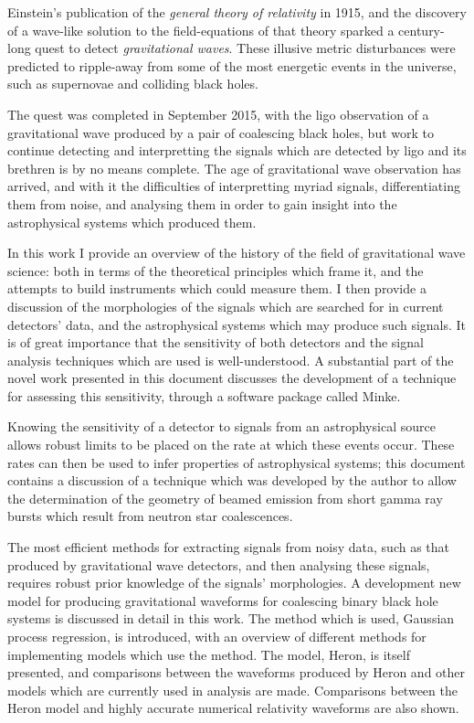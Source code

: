   Einstein's publication of the \textit{general theory of relativity} in 1915, and the discovery of a wave-like solution to the field-equations of that theory sparked a century-long quest to detect \textit{gravitational waves}.
  These illusive metric disturbances were predicted to ripple-away from some of the most energetic events in the universe, such as supernovae and colliding black holes.
  
  The quest was completed in September 2015, with the \gls{ligo} observation of a gravitational wave produced by a pair of coalescing black holes, but work to continue detecting and interpretting the signals which are detected by \gls{ligo} and its brethren is by no means complete.
  The age of gravitational wave observation has arrived, and with it the difficulties of interpretting myriad signals, differentiating them from noise, and analysing them in order to gain insight into the astrophysical systems which produced them.

  In this work I provide an overview of the history of the field of gravitational wave science: both in terms of the theoretical principles which frame it, and the attempts to build instruments which could measure them.
  I then provide a discussion of the morphologies of the signals which are searched for in current detectors' data, and the astrophysical systems which may produce such signals.
  It is of great importance that the sensitivity of both detectors and the signal analysis techniques which are used is well-understood.
  A substantial part of the novel work presented in this document discusses the development of a technique for assessing this sensitivity, through a software package called Minke.

  Knowing the sensitivity of a detector to signals from an astrophysical source allows robust limits to be placed on the rate at which these events occur.
  These rates can then be used to infer properties of astrophysical systems; this document contains a discussion of a technique which was developed by the author to allow the determination of the geometry of beamed emission from short gamma ray bursts which result from neutron star coalescences.

  The most efficient methods for extracting signals from noisy data, such as that produced by gravitational wave detectors, and then analysing these signals, requires robust prior knowledge of the signals' morphologies.
  A development new model for producing gravitational waveforms for coalescing binary black hole systems is discussed in detail in this work.
  The method which is used, Gaussian process regression, is introduced, with an overview of different methods for implementing models which use the method.
  The model, Heron, is itself presented, and comparisons between the waveforms produced by Heron and other models which are currently used in analysis are made.
  Comparisons between the Heron model and highly accurate numerical relativity waveforms are also shown.